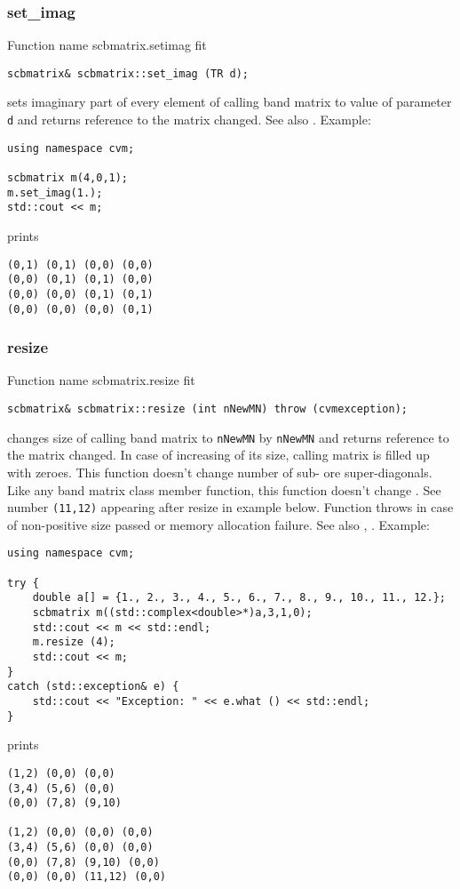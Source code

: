 \subsubsection{set\_imag}
Function%
\pdfdest name {scbmatrix.setimag} fit
\begin{verbatim}
scbmatrix& scbmatrix::set_imag (TR d);
\end{verbatim}
sets imaginary part of every element of  calling band matrix to  value of
parameter \verb"d"
and returns  reference to the matrix changed.
See also .
Example:
\begin{Verbatim}
using namespace cvm;

scbmatrix m(4,0,1);
m.set_imag(1.);
std::cout << m;
\end{Verbatim}
prints
\begin{Verbatim}
(0,1) (0,1) (0,0) (0,0)
(0,0) (0,1) (0,1) (0,0)
(0,0) (0,0) (0,1) (0,1)
(0,0) (0,0) (0,0) (0,1)
\end{Verbatim}
\newpage



\subsubsection{resize}
Function%
\pdfdest name {scbmatrix.resize} fit
\begin{verbatim}
scbmatrix& scbmatrix::resize (int nNewMN) throw (cvmexception);
\end{verbatim}
changes  size of  calling band matrix to \verb"nNewMN" by \verb"nNewMN"
and returns  reference to
the matrix changed. In case of increasing of its size, calling matrix
is filled up with zeroes. This function doesn't change
 number of sub- ore super-diagonals. Like any band matrix 
class member function, this function doesn't change 
. 
See number \verb"(11,12)" appearing after
resize in example below.
Function throws  
in case of non-positive size passed or memory allocation failure.
See also ,
.
Example:
\begin{Verbatim}
using namespace cvm;

try {
    double a[] = {1., 2., 3., 4., 5., 6., 7., 8., 9., 10., 11., 12.};
    scbmatrix m((std::complex<double>*)a,3,1,0);
    std::cout << m << std::endl;
    m.resize (4);
    std::cout << m;
}
catch (std::exception& e) {
    std::cout << "Exception: " << e.what () << std::endl;
}
\end{Verbatim}
prints
\begin{Verbatim}
(1,2) (0,0) (0,0)
(3,4) (5,6) (0,0)
(0,0) (7,8) (9,10)

(1,2) (0,0) (0,0) (0,0)
(3,4) (5,6) (0,0) (0,0)
(0,0) (7,8) (9,10) (0,0)
(0,0) (0,0) (11,12) (0,0)
\end{Verbatim}
\newpage





